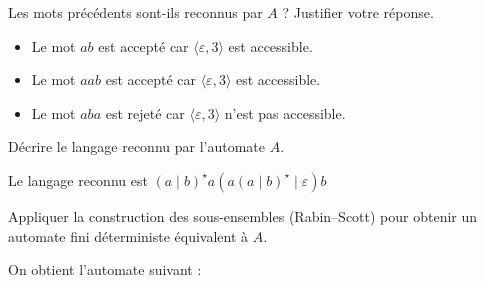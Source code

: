 \begin{exercice}
  \begin{questions}
  \item Les mots précédents sont-ils reconnus par $A$ ?
    Justifier votre réponse.
  \end{questions}
  \begin{corrections}
    \begin{itemize}
    \item Le mot $ab$ est accepté car $\langle \varepsilon, 3\rangle$ est accessible.
    \item Le mot $aab$ est accepté car $\langle \varepsilon, 3\rangle$ est accessible.
    \item Le mot $aba$ est rejeté car $\langle \varepsilon, 3\rangle$ n'est pas accessible.
    \end{itemize}
  \end{corrections}

  \begin{questions}
  \item Décrire le langage reconnu par l'automate $A$.
  \end{questions}
  \begin{corrections}
    Le langage reconnu est $(a\mid b)^\star a (a(a\mid b)^\star \mid \varepsilon)  b$
  \end{corrections}

  \ifcorrection{\pagebreak}
  \begin{questions}
  \item Appliquer la construction des sous-ensembles (Rabin--Scott) pour obtenir
    un automate fini déterministe équivalent à $A$.
  \end{questions}
  \begin{corrections}
    On obtient l'automate suivant :
  \end{corrections}

\end{exercice}

\endgroup
\endinput
